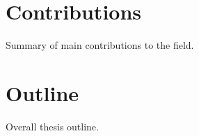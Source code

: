 
\section{Contributions}

{\color{red}Summary of main contributions to the field.}

\section{Outline}

{\color{red}Overall thesis outline.}
